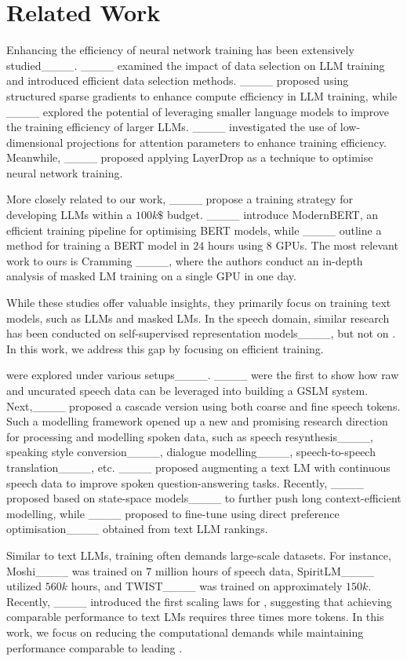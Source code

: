 \section{Related Work}
 Enhancing the efficiency of neural network training has been extensively studied____. ____ examined the impact of data selection on \ac{LLM} training and introduced efficient data selection methods. ____ proposed using structured sparse gradients to enhance compute efficiency in \ac{LLM} training, while ____ explored the potential of leveraging smaller language models to improve the training efficiency of larger \ac{LLM}s. ____ investigated the use of low-dimensional projections for attention parameters to enhance training efficiency. Meanwhile, ____ proposed applying LayerDrop as a technique to optimise neural network training.

More closely related to our work, ____ propose a training strategy for developing \ac{LLM}s within a $100k\$$ budget. ____ introduce ModernBERT, an efficient training pipeline for optimising BERT models, while ____ outline a method for training a BERT model in $24$ hours using $8$ GPUs. The most relevant work to ours is Cramming ____, where the authors conduct an in-depth analysis of masked LM training on a single GPU in one day.

While these studies offer valuable insights, they primarily focus on training text models, such as \ac{LLM}s and masked LMs. In the speech domain, similar research has been conducted on self-supervised representation models____, but not on \slms. In this work, we address this gap by focusing on efficient \slm training.

 were explored under various setups____.  
____ were the first to show how raw and uncurated speech data can be leveraged into building a \ac{GSLM} system. Next,____ proposed a cascade version using both coarse and fine speech tokens. Such a modelling framework opened up a new and promising research direction for processing and modelling spoken data, such as speech resynthesis____, speaking style conversion____, dialogue modelling____, speech-to-speech translation____, etc. 
____ proposed augmenting a text \ac{LM} with continuous speech data to improve spoken question-answering tasks. Recently, ____ proposed \slm based on state-space models____ to further push long context-efficient modelling, while ____ proposed to fine-tune \slms using direct preference optimisation____ obtained from text LLM rankings. 

Similar to text \ac{LLMs}, training \slms often demands large-scale datasets. For instance, Moshi____ was trained on $7$ million hours of speech data, SpiritLM____ utilized $560k$ hours, and TWIST____ was trained on approximately $150k$. Recently, ____ introduced the first scaling laws for \slms, suggesting that achieving comparable performance to text LMs requires three times more tokens. In this work, we focus on reducing the computational demands while maintaining performance comparable to leading \slms.
